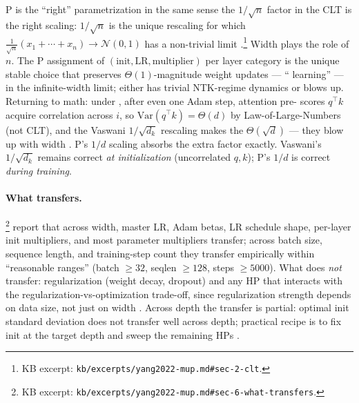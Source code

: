 \begin{analogy}
\textmu P is the ``right'' parametrization in the same sense the
$1/\sqrt{n}$ factor in the CLT is the right scaling: $1/\sqrt{n}$ is
the unique rescaling for which $\frac{1}{\sqrt{n}}(x_1 + \cdots + x_n)
\to \mathcal{N}(0, 1)$ has a non-trivial limit
\citep[\S 2]{yang2022-mup}.\footnote{KB excerpt:
\nolinkurl{kb/excerpts/yang2022-mup.md#sec-2-clt}.} Width plays the role
of $n$. The \textmu P assignment of $(\text{init}, \text{LR},
\text{multiplier})$ per layer category is the unique stable choice
that preserves $\Theta(1)$-magnitude weight updates --- ``
learning'' --- in the infinite-width limit;  either has trivial
NTK-regime dynamics or blows up. Returning to math: under , after
even one Adam step, attention pre- scores $q^\top k$ acquire
correlation across $i$, so $\mathrm{Var}(q^\top k) = \Theta(d)$ by
Law-of-Large-Numbers (not CLT), and the Vaswani $1/\sqrt{d_k}$
rescaling makes the  $\Theta(\sqrt{d})$ --- they blow up with
width \citep[\S 5]{yang2022-mup}. \textmu P's $1/d$ scaling absorbs the
extra factor exactly. Vaswani's $1/\sqrt{d_k}$ remains correct
\emph{at initialization} (uncorrelated $q, k$); \textmu P's $1/d$ is
correct \emph{during training}.
\end{analogy}

\paragraph{What transfers.}
\citet[\S 6]{yang2022-mup}\footnote{KB excerpt:
\nolinkurl{kb/excerpts/yang2022-mup.md#sec-6-what-transfers}.} report
that across width, master LR, Adam betas, LR schedule shape, per-layer
init multipliers, and most parameter multipliers transfer; across batch
size, sequence length, and training-step count they transfer
empirically within ``reasonable ranges'' (batch $\geq 32$, seqlen
$\geq 128$, steps $\geq 5000$). What does \emph{not} transfer:
regularization (weight decay, dropout) and any HP that interacts with
the regularization-vs-optimization trade-off, since regularization
strength depends on data size, not just on width
\citep[\S 6]{yang2022-mup}. Across depth the transfer is partial:
optimal init standard deviation does not transfer well across depth;
practical recipe is to fix init at the target depth and sweep the
remaining HPs \citep[\S 6.1]{yang2022-mup}.

